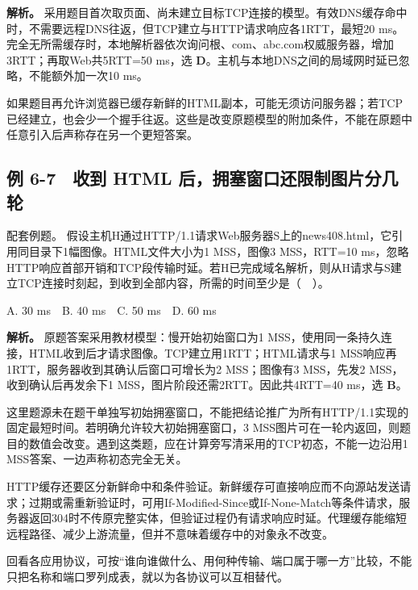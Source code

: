 \textbf{解析。} 采用题目首次取页面、尚未建立目标TCP连接的模型。有效DNS缓存命中时，不需要远程DNS往返，但TCP建立与HTTP请求响应各1RTT，最短20 ms。完全无所需缓存时，本地解析器依次询问根、com、abc.com权威服务器，增加3RTT；再取Web共5RTT=50 ms，选 \textbf{D}。主机与本地DNS之间的局域网时延已忽略，不能额外加一次10 ms。

如果题目再允许浏览器已缓存新鲜的HTML副本，可能无须访问服务器；若TCP已经建立，也会少一个握手往返。这些是改变原题模型的附加条件，不能在原题中任意引入后声称存在另一个更短答案。

\subsection{例 6-7　收到 HTML 后，拥塞窗口还限制图片分几轮}\label{CN06-ex7}

\begin{example}[配套例题]

配套例题。 假设主机H通过HTTP/1.1请求Web服务器S上的news408.html，它引用同目录下1幅图像。HTML文件大小为1 MSS，图像3 MSS，RTT=10 ms，忽略HTTP响应首部开销和TCP段传输时延。若H已完成域名解析，则从H请求与S建立TCP连接时刻起，到收到全部内容，所需的时间至少是（　）。

A. 30 ms　B. 40 ms　C. 50 ms　D. 60 ms

\end{example}

\textbf{解析。} 原题答案采用教材模型：慢开始初始窗口为1 MSS，使用同一条持久连接，HTML收到后才请求图像。TCP建立用1RTT；HTML请求与1 MSS响应再1RTT，服务器收到其确认后窗口可增长为2 MSS；图像有3 MSS，先发2 MSS，收到确认后再发余下1 MSS，图片阶段还需2RTT。因此共4RTT=40 ms，选 \textbf{B}。

这里题源未在题干单独写初始拥塞窗口，不能把结论推广为所有HTTP/1.1实现的固定最短时间。若明确允许较大初始拥塞窗口，3 MSS图片可在一轮内返回，则题目的数值会改变。遇到这类题，应在计算旁写清采用的TCP初态，不能一边沿用1 MSS答案、一边声称初态完全无关。

HTTP缓存还要区分新鲜命中和条件验证。新鲜缓存可直接响应而不向源站发送请求；过期或需重新验证时，可用If-Modified-Since或If-None-Match等条件请求，服务器返回304时不传原完整实体，但验证过程仍有请求响应时延。代理缓存能缩短远程路径、减少上游流量，但并不意味着缓存中的对象永不改变。

回看各应用协议，可按``谁向谁做什么、用何种传输、端口属于哪一方''比较，不能只把名称和端口罗列成表，就以为各协议可以互相替代。

